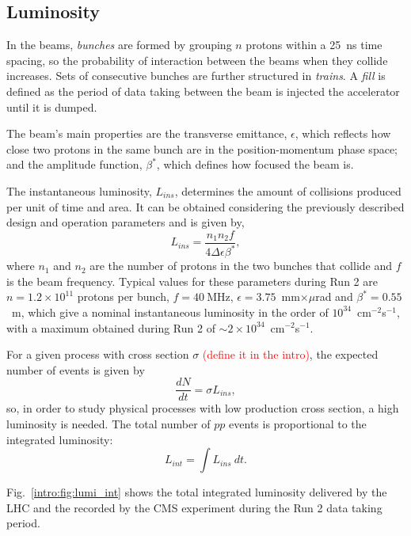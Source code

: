 \documentclass[../main.tex]{subfiles}
\begin{document}
\subsection{Luminosity}

In the beams, \textit{bunches} are formed by grouping $n$ protons within a 25~ns time spacing, so the probability of interaction between the beams when they collide increases. Sets of consecutive bunches are further structured in \textit{trains}. A \textit{fill} is defined as the period of data taking between the beam is injected the accelerator until it is dumped. 

The beam's main properties are the transverse emittance, $\epsilon$, which reflects how close two protons in the same bunch are in the position-momentum phase space; and the amplitude function, $\beta^*$, which defines how focused the beam is.


The instantaneous luminosity, $L_{ins}$, determines the amount of collisions produced per unit of time and area. It can be obtained considering the previously described design and operation parameters and is given by,
\begin{equation}
L_{ins} = \frac{n_1 n_2 f}{4\Delta\epsilon\beta^*},
\label{intro:eq:lumi_inst}
\end{equation}
where $n_1$ and $n_2$ are the number of protons in the two bunches that collide and $f$ is the beam frequency. Typical values for these parameters during Run 2 are $n=1.2\times10^{11}$ protons per bunch, $f=40~$MHz, $\epsilon=3.75$~mm$\times\mu$rad and $\beta^*=0.55$~m, which give a nominal instantaneous luminosity in the order of $10^{34}$~cm${}^{-2}$s${}^{-1}$, with a maximum obtained during Run 2 of $\sim2\times10^{34}$~cm${}^{-2}$s${}^{-1}$. 

For a given process with cross section $\sigma$ \textcolor{red}{(define it in the intro)}, the expected number of events is given by
\begin{equation}
\frac{dN}{dt} = \sigma L_{ins},
\end{equation}
so, in order to study physical processes with low production cross section, a high luminosity is needed. The total number of $pp$ events is proportional to the integrated luminosity:
\begin{equation}
L_{int} = \int L_{ins}~dt.
\end{equation}

Fig.~\ref{intro:fig:lumi_int} shows the total integrated luminosity delivered by the LHC and the recorded by the CMS experiment during the Run 2 data taking period.
\end{document}
